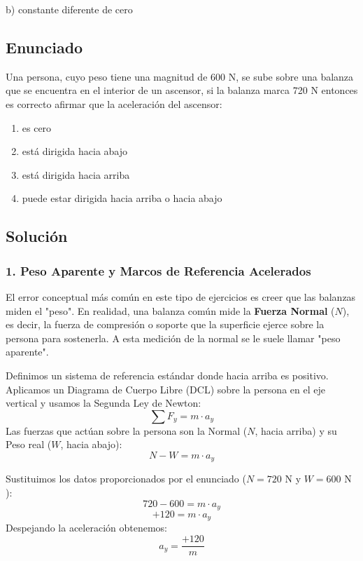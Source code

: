 \documentclass[12pt, a4paper]{article}
\begin{document}
\begin{tcolorbox}[colback=green!5!white, colframe=green!50!black, title=Respuesta Final]
\centering \Large b) constante diferente de cero
\end{tcolorbox}

\newpage

\subsection*{Enunciado}
Una persona, cuyo peso tiene una magnitud de 600 N, se sube sobre una balanza que se encuentra en el interior de un ascensor, si la balanza marca 720 N entonces es correcto afirmar que la aceleración del ascensor:
\begin{enumerate}[label=\alph*)]
    \item es cero
    \item está dirigida hacia abajo
    \item está dirigida hacia arriba
    \item puede estar dirigida hacia arriba o hacia abajo
\end{enumerate}

\subsection*{Solución}

\subsubsection*{1. Peso Aparente y Marcos de Referencia Acelerados}
El error conceptual más común en este tipo de ejercicios es creer que las balanzas miden el "peso". En realidad, una balanza común mide la \textbf{Fuerza Normal} ($N$), es decir, la fuerza de compresión o soporte que la superficie ejerce sobre la persona para sostenerla. A esta medición de la normal se le suele llamar "peso aparente".

Definimos un sistema de referencia estándar donde hacia arriba es positivo. 
Aplicamos un Diagrama de Cuerpo Libre (DCL) sobre la persona en el eje vertical y usamos la Segunda Ley de Newton:
$$ \sum F_y = m \cdot a_y $$
Las fuerzas que actúan sobre la persona son la Normal ($N$, hacia arriba) y su Peso real ($W$, hacia abajo):
$$ N - W = m \cdot a_y $$

Sustituimos los datos proporcionados por el enunciado ($N = 720\text{ N}$ y $W = 600\text{ N}$):
$$ 720 - 600 = m \cdot a_y $$
$$ +120 = m \cdot a_y $$
Despejando la aceleración obtenemos:
$$ a_y = \frac{+120}{m} $$
\end{document}
